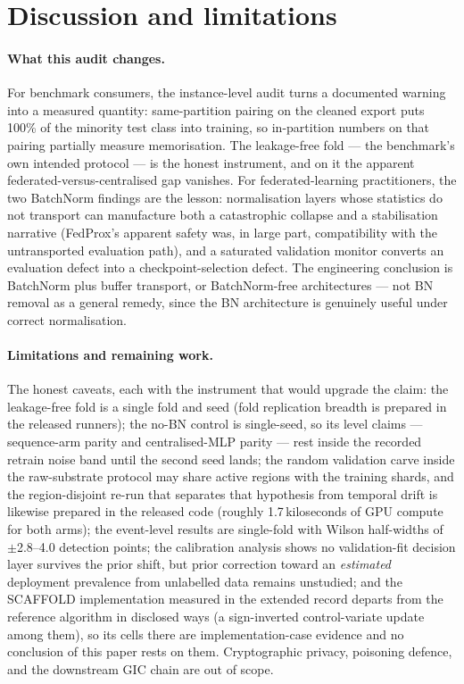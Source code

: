 \section{Discussion and limitations}\label{sec:discussion}

\paragraph{What this audit changes.}
For benchmark consumers, the instance-level audit turns a documented
warning~\cite{angryk2019,eskandari2024} into a measured quantity:
same-partition pairing on the cleaned export puts 100\% of the
minority test class into training, so in-partition numbers on that
pairing partially measure memorisation. The leakage-free fold --- the
benchmark's own intended protocol --- is the honest instrument, and
on it the apparent federated-versus-centralised gap vanishes. For
federated-learning practitioners, the two BatchNorm findings are the
lesson: normalisation layers whose statistics do not transport can
manufacture both a catastrophic collapse and a stabilisation
narrative (FedProx's apparent safety was, in large part, compatibility
with the untransported evaluation path), and a saturated validation
monitor converts an evaluation defect into a checkpoint-selection
defect. The engineering conclusion is BatchNorm plus buffer
transport, or BatchNorm-free architectures --- not BN removal as a
general remedy, since the BN architecture is genuinely useful under
correct normalisation.

\paragraph{Limitations and remaining work.}
The honest caveats, each with the instrument that would upgrade the
claim: the leakage-free fold is a single fold and seed (fold
replication breadth is prepared in the released runners); the no-BN
control is single-seed, so its level claims --- sequence-arm parity
and centralised-MLP parity --- rest inside the recorded retrain
noise band until the second seed lands; the random validation carve
inside the raw-substrate protocol may share active regions with the
training shards, and the region-disjoint re-run that separates that
hypothesis from temporal drift is likewise prepared in the released
code (roughly 1.7\,kiloseconds of GPU compute for both arms); the
event-level results are single-fold with Wilson half-widths of
$\pm$2.8--4.0 detection points; the calibration analysis shows no
validation-fit decision layer survives the prior shift, but
prior correction toward an \emph{estimated} deployment prevalence
from unlabelled data remains unstudied; and the SCAFFOLD
implementation measured in the extended record departs from the
reference algorithm in disclosed ways (a sign-inverted
control-variate update among them), so its cells there are
implementation-case evidence and no conclusion of this paper rests
on them. Cryptographic privacy, poisoning defence, and the
downstream GIC chain are out of scope.

